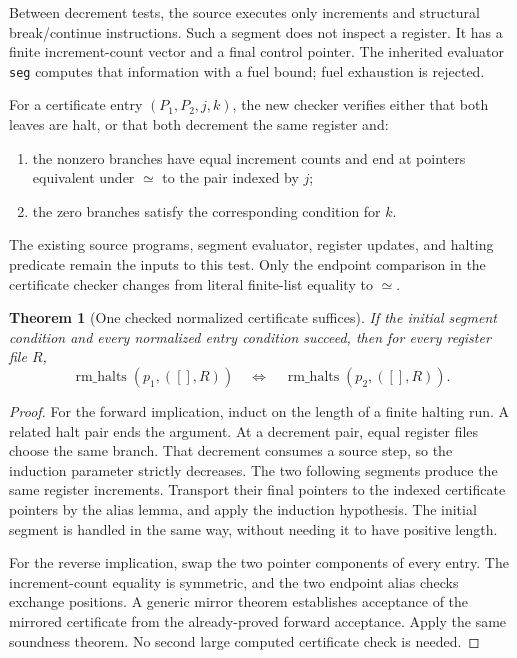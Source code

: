 \documentclass[11pt]{article}
\newtheorem{theorem}{Theorem}[section]
\theoremstyle{definition}\newtheorem{definition}[theorem]{Definition}
\begin{document}
Between decrement tests, the source executes only increments and structural
break/continue instructions. Such a segment does not inspect a register.
It has a finite increment-count vector and a final control pointer. The
inherited evaluator \texttt{seg} computes that information with a fuel bound;
fuel exhaustion is rejected.

For a certificate entry $(P_1,P_2,j,k)$, the new checker verifies either that
both leaves are halt, or that both decrement the same register and:
\begin{enumerate}
\item the nonzero branches have equal increment counts and end at pointers
equivalent under $\simeq$ to the pair indexed by $j$;
\item the zero branches satisfy the corresponding condition for $k$.
\end{enumerate}
The existing source programs, segment evaluator, register updates, and halting
predicate remain the inputs to this test. Only the endpoint comparison in the
certificate checker changes from literal finite-list equality to $\simeq$.

\begin{theorem}[One checked normalized certificate suffices]
If the initial segment condition and every normalized entry condition succeed,
then for every register file $R$,
\[
 \operatorname{rm\_halts}(p_1,([],R))
 \quad\Longleftrightarrow\quad
 \operatorname{rm\_halts}(p_2,([],R)).
\]
\end{theorem}

\begin{proof}
For the forward implication, induct on the length of a finite halting run.
A related halt pair ends the argument. At a decrement pair, equal register
files choose the same branch. That decrement consumes a source step, so the
induction parameter strictly decreases. The two following segments produce
the same register increments. Transport their final pointers to the indexed
certificate pointers by the alias lemma, and apply the induction hypothesis.
The initial segment is handled in the same way, without needing it to have
positive length.

For the reverse implication, swap the two pointer components of every entry.
The increment-count equality is symmetric, and the two endpoint alias checks
exchange positions. A generic mirror theorem establishes acceptance of the
mirrored certificate from the already-proved forward acceptance. Apply the
same soundness theorem. No second large computed certificate check is needed.
\end{proof}
\end{document}
